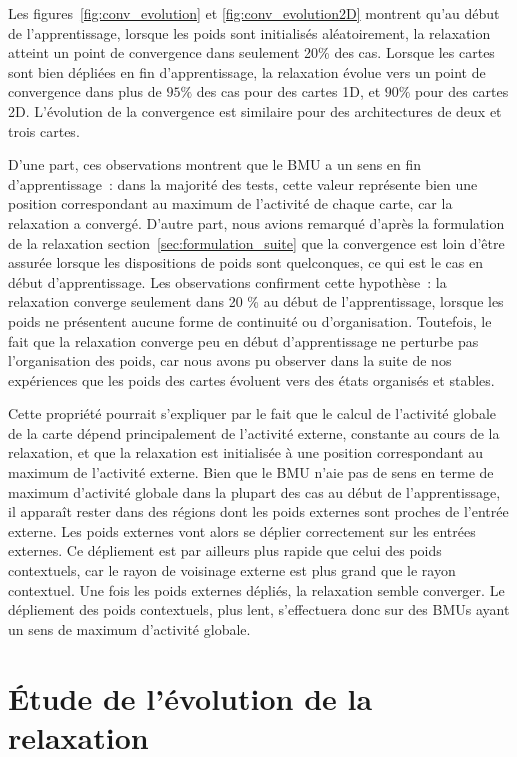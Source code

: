 \documentclass[../main]{subfiles}
\begin{document}
Les figures~\ref{fig:conv_evolution} et \ref{fig:conv_evolution2D} montrent qu'au début de l'apprentissage, lorsque les poids sont initialisés aléatoirement, la relaxation atteint un point de convergence dans seulement 20\% des cas. Lorsque les cartes sont bien dépliées en fin d'apprentissage, la relaxation évolue vers un point de convergence dans plus de $95\%$ des cas pour des cartes 1D, et $90\%$ pour des cartes 2D. L'évolution de la convergence est similaire pour des architectures de deux et trois cartes.

D'une part, ces observations montrent que le BMU a un sens en fin d'apprentissage~: dans la majorité des tests, cette valeur représente bien une position correspondant au maximum de l'activité de chaque carte, car la relaxation a convergé.
D'autre part, nous avions remarqué d'après la formulation de la relaxation section~\ref{sec:formulation_suite} que la convergence est loin d'être assurée lorsque les dispositions de poids sont quelconques, ce qui est  le cas en début d'apprentissage. 
Les observations confirment cette hypothèse~: la relaxation converge seulement dans 20 \% au début de l'apprentissage, lorsque les poids ne présentent aucune forme de continuité ou d'organisation.
Toutefois, le fait que la relaxation converge peu en début d'apprentissage ne perturbe pas l'organisation des poids, car nous avons pu observer dans la suite de nos expériences que les poids des cartes évoluent vers des états organisés et stables.

Cette propriété pourrait s'expliquer par le fait que le calcul de l'activité globale de la carte dépend principalement de l'activité externe, constante au cours de la relaxation, et que la relaxation est initialisée à une position correspondant au maximum de l'activité externe.
Bien que le BMU n'aie pas de \og sens \fg{} en terme de maximum d'activité globale dans la plupart des cas au début de l'apprentissage, il apparaît rester dans des régions dont les poids externes sont proches de l'entrée externe.
Les poids externes vont alors se déplier correctement sur les entrées externes. Ce dépliement est par ailleurs plus rapide que celui des poids contextuels, car le rayon de voisinage externe est plus grand que le rayon contextuel.
Une fois les poids externes dépliés, la relaxation semble converger. Le dépliement des poids contextuels, plus lent, s'effectuera donc sur des BMUs ayant un sens de maximum d'activité globale.

\section{\'Etude de l'évolution de la relaxation}
\end{document}
